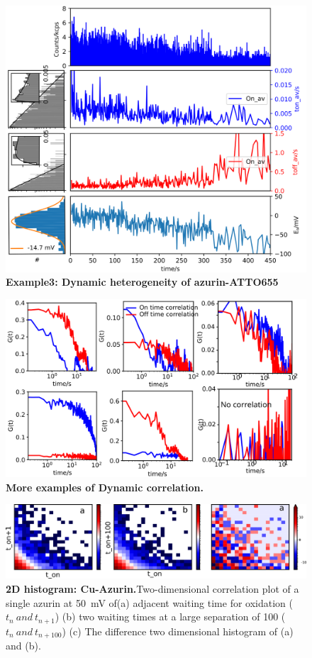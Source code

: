 \begin{figure}
  \centering
  \includegraphics[width=\textwidth]{dynamic_Point_21_75mV_S105}
  \caption{\textbf{Example3: Dynamic heterogeneity of azurin-ATTO655}}
  \label{SIfig:dynamic_Point_21_75mV_S105}
\end{figure}

\begin{figure}
  \centering
  \includegraphics[width=\textwidth]{Dynamic_corr_many}
  \caption{\textbf{More examples of Dynamic correlation.} 
  }
  \label{SIfig:Dynamic_corr_many}
\end{figure}
\begin{figure}
  \centering
  \includegraphics[width=\textwidth]{Figure_4_on_off_2D_100mV}
  \caption{\textbf{2D histogram: Cu-Azurin.}Two-dimensional correlation plot of a single azurin at \SI{50}{\mV} of(a) adjacent waiting time for oxidation ($t_{n}~and~t_{n+1}$) (b) two waiting times at a large separation of 100 ($t_{n}~and~t_{n+100}$) (c) The difference two dimensional histogram of (a) and (b).}
  \label{SIfig:onoff2D}
\end{figure}